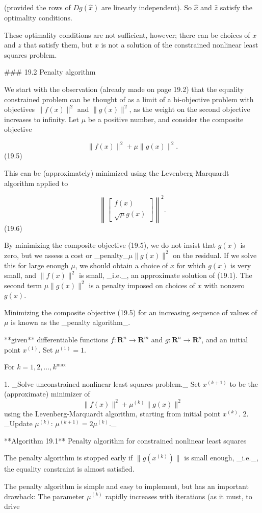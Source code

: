 (provided the rows of \(Dg(\hat{x})\) are linearly independent). So \(\hat{x}\) and \(\hat{z}\) satisfy the optimality conditions.

These optimality conditions are not sufficient, however; there can be choices of \(x\) and \(z\) that satisfy them, but \(x\) is not a solution of the constrained nonlinear least squares problem.

### 19.2 Penalty algorithm

We start with the observation (already made on page 19.2) that the equality constrained problem can be thought of as a limit of a bi-objective problem with objectives \(\|f(x)\|^{2}\) and \(\|g(x)\|^{2}\), as the weight on the second objective increases to infinity. Let \(\mu\) be a positive number, and consider the composite objective

\[\|f(x)\|^{2}+\mu\|g(x)\|^{2}.\] (19.5)

This can be (approximately) minimized using the Levenberg-Marquardt algorithm applied to

\[\left\|\left[\begin{array}{c}f(x)\\ \sqrt{\mu}g(x)\end{array}\right]\right\|^{2}.\] (19.6)

By minimizing the composite objective (19.5), we do not insist that \(g(x)\) is zero, but we assess a cost or _penalty_\(\mu\|g(x)\|^{2}\) on the residual. If we solve this for large enough \(\mu\), we should obtain a choice of \(x\) for which \(g(x)\) is very small, and \(\|f(x)\|^{2}\) is small, _i.e._, an approximate solution of (19.1). The second term \(\mu\|g(x)\|^{2}\) is a penalty imposed on choices of \(x\) with nonzero \(g(x)\).

Minimizing the composite objective (19.5) for an increasing sequence of values of \(\mu\) is known as the _penalty algorithm_.

**given** differentiable functions \(f:\mathbf{R}^{n}\to\mathbf{R}^{m}\) and \(g:\mathbf{R}^{n}\to\mathbf{R}^{p}\), and an initial point \(x^{(1)}\). Set \(\mu^{(1)}=1\).

For \(k=1,2,\ldots,k^{\max}\)

1. _Solve unconstrained nonlinear least squares problem._ Set \(x^{(k+1)}\) to be the (approximate) minimizer of \[\|f(x)\|^{2}+\mu^{(k)}\|g(x)\|^{2}\] using the Levenberg-Marquardt algorithm, starting from initial point \(x^{(k)}\).
2. _Update \(\mu^{(k)}\): \(\mu^{(k+1)}=2\mu^{(k)}\)._

**Algorithm 19.1** Penalty algorithm for constrained nonlinear least squares

The penalty algorithm is stopped early if \(\|g(x^{(k)})\|\) is small enough, _i.e._, the equality constraint is almost satisfied.

The penalty algorithm is simple and easy to implement, but has an important drawback: The parameter \(\mu^{(k)}\) rapidly increases with iterations (as it must, to drive 